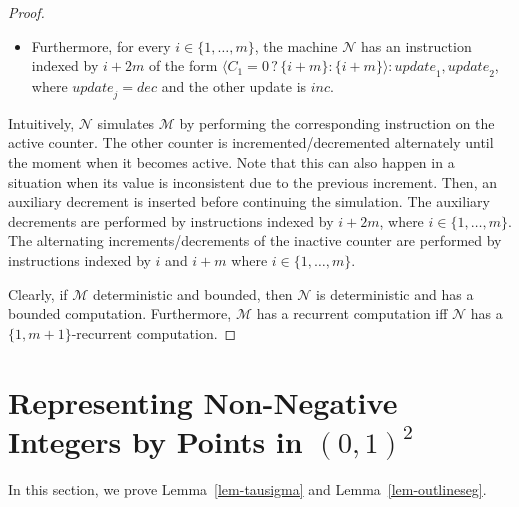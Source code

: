 \documentclass[a4paper,UKenglish,cleveref, autoref, thm-restate]{lipics-v2021}
\newcommand{\M}{\mathcal{M}}
\newcommand{\update}{\textit{update}}
\newcommand{\Dec}{\textit{dec}}
\newcommand{\Inc}{\textit{inc}}
\begin{document}
\begin{proof}
\begin{itemize}
\begin{itemize}
        \end{itemize}
        \item Furthermore, for every $i \in \{1,\ldots,m\}$, the machine $\mathcal{N}$ has an instruction indexed by $i {+} 2m$ of the form
        \( 
            \langle C_1{=}0 \,?\, \{i{+}m\} : \{i{+}m\} \rangle : \update_1,\update_2
        \), where $\update_j = \Dec$ and the other update is $\Inc$.
    \end{itemize}
    Intuitively, $\mathcal{N}$ simulates $\M$ by performing the corresponding instruction on the active counter. The other counter is incremented/decremented alternately until the moment when it becomes active. Note that this can also happen in a situation when its value is inconsistent due to the previous increment. Then, an auxiliary decrement is inserted before continuing the simulation. The auxiliary decrements are performed by instructions indexed by $i{+}2m$, where $i \in \{1,\ldots,m\}$. The alternating increments/decrements of the inactive counter are performed by instructions indexed by $i$ and $i+m$ where $i \in \{1,\ldots,m\}$.
    
    Clearly, if $\M$ deterministic and bounded, then $\mathcal{N}$ is deterministic and has a bounded computation. Furthermore, $\M$ has a recurrent computation iff $\mathcal{N}$ has a $\{1,m{+}1\}$-recurrent computation.
\end{proof}

 \section{Representing Non-Negative Integers by Points in $(0,1)^2$}
\label{app-area}

In this section, we prove Lemma~\ref{lem-tausigma} and Lemma~\ref{lem-outlineseg}.
\end{document}
